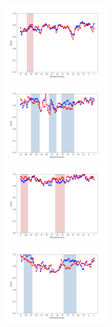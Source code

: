 \documentclass[11pt]{jreport}
\begin{document}
\begin{figure}[H]
\begin{minipage}{\textwidth}
\vspace{0.08\textheight}
\begin{center}
    \includegraphics[width=0.495\textwidth]{Uenaka_fig/RQ2_result/Nova_review_Recall.pdf}
    \includegraphics[width=0.495\textwidth]{Uenaka_fig/RQ2_result/Neutron_review_Recall.pdf}
    \includegraphics[width=0.495\textwidth]{Uenaka_fig/RQ2_result/Cinder_review_Recall.pdf}
    \includegraphics[width=0.495\textwidth]{Uenaka_fig/RQ2_result/Keystone_review_Recall.pdf}

\end{center}
\end{minipage}
\end{figure}
\end{document}
